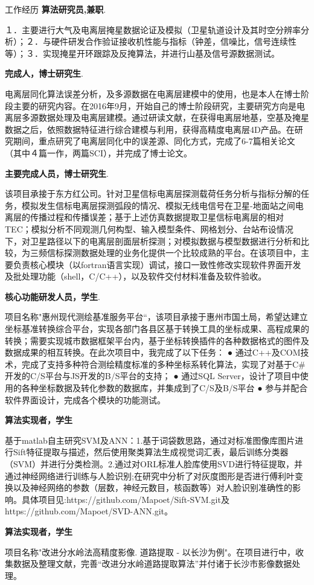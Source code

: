 \begin{rubric}{工作经历}
\entry*[2020 至今]\textbf{算法研究员,兼职}.

１．主要进行大气及电离层掩星数据论证及模拟（卫星轨道设计及其时空分辨率分析）；２．与硬件研发合作验证接收机性能与指标（钟差，信噪比，信号连续性等）；３．实现掩星开环跟踪及反掩算法，并进行山基及信号源数据测试。

\entry*[2016-09 至 2020年7月]\space\textbf{完成人，博士研究生}.

电离层同化算法误差分析，及多源数据在电离层建模中的使用，也是本人在博士阶段主要的研究内容。在2016年9月，开始自己的博士阶段研究，主要研究方向是电离层多源数据处理及电离层建模。通过研读文献，在获得电离层地基，空基及掩星数据之后，依照数据特征进行综合建模与利用，获得高精度电离层4D产品。在研究期间，重点研究了电离层同化中的误差源、同化方式，完成了6-7篇相关论文（其中４篇一作，两篇SCI），并完成了博士论文。

\entry*[2015-06 至 2016-09]\space\textbf{主要完成人员，博士研究生}.

该项目承接于东方红公司。针对卫星信标电离层探测载荷任务分析与指标分解的任务，模拟发生信标电离层探测弧段的情况、模拟无线电信号在卫星-地面站之间电离层的传播过程和传播误差；基于上述仿真数据提取卫星信标电离层的相对TEC；模拟分析不同观测几何构型、输入模型条件、网格划分、台站布设情况下，对卫星路径以下的电离层剖面层析探测；对模拟数据与模型数据进行分析和比较，为三频信标探测数据处理的业务化提供一个比较成熟的平台。在该项目中，主要负责核心模块（以fortran语言实现）调试，接口一致性修改实现软件界面开发及批处理功能（shell，C/C++），以及软件交付材料准备及软件验收。

\entry*[2013-06 至 2014-08]\space\textbf{核心功能研发人员，学生}.

项目名称"惠州现代测绘基准服务平台“，该项目承接于惠州市国土局，希望达建立坐标基准转换综合平台，实现各部门各县区基于转换工具的坐标成果、高程成果的转换；需要实现城市数据框架平台内，基于坐标转换插件的各种数据格式的图件及数据成果的相互转换。在此次项目中，我完成了以下任务： ● 通过C++及COM技术，完成了支持多种符合测绘精度标准的多种坐标系转化算法，实现了对基于C\#开发的C/S平台与JS开发的B/S平台的支持； ● 通过SQL Server，设计了项目中使用的各种坐标数据及转化参数的数据库，并集成到了C/S及B/S平台 ● 参与并配合软件界面设计，完成各个模块的功能测试。

\entry*[2014-03 至 2014-06]\space\textbf{算法实现者，学生}

基于matlab自主研究SVM及ANN：1.基于词袋数思路，通过对标准图像库图片进行Sift特征提取与描述，然后使用聚类算法生成视觉词汇表，最后训练分类器（SVM）并进行分类检测。2.通过对ORL标准人脸库使用SVD进行特征提取，并通过神经网络进行训练与人脸识别;在研究中分析了对灰度图形是否进行傅利叶变换以及神经网络的参数（层数，神经元数目，核函数等）对人脸识别准确性的影响。具体项目见:https://github.com/Mapoet/Sift-SVM.git及https://github.com/Mapoet/SVD-ANN.git。

\entry*[2013-06 至 2014-06]\space\textbf{算法实现者，学生}

项目名称"改进分水岭法高精度影像. 道路提取 - 以长沙为例"。在项目进行中，收集数据及整理文献，完善“改进分水岭道路提取算法”并付诸于长沙市影像数据处理。

\end{rubric}


